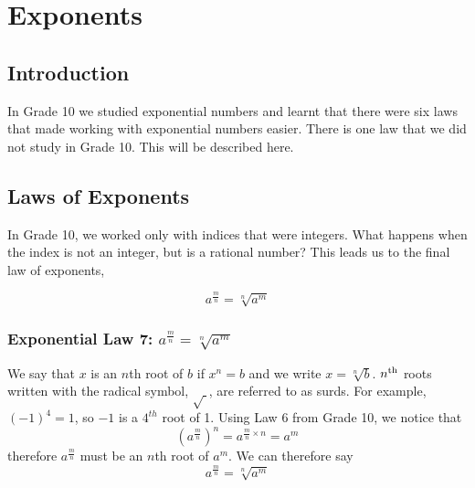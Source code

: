 \chapter{Exponents}
\label{m:ng11}  

\section{Introduction}
In Grade 10 we studied exponential numbers and learnt that there were six laws that made working with exponential numbers easier. There is one law that we did not study in Grade 10. This will be described here.

\section{Laws of Exponents}

In Grade 10, we worked only with indices that were integers. What happens when the index is not an integer, but is a rational number? This leads us to the final law of exponents,

\begin{equation}
\label{eq:mn:e:law7}
a^{\frac{m}{n}}= \sqrt[n]{a^m}
\end{equation}

\subsection{Exponential Law 7: $a^{\frac mn}=\sqrt[n]{a^m}$}
We say that $x$ is an $n$th root of $b$ if $x^n=b$ and we write $x=\sqrt[n]{b}$. $n^{\rm th}$ roots written with the radical symbol, $\sqrt{~}$, are referred to as surds. For example, $(-1)^4=1$, so $-1$ is a $4^{th}$ root of 1. Using Law 6 from Grade 10, we notice that
\begin{equation}
\label{eq:mn:e:law7:col} 
(a^{\frac mn})^n=a^{\frac mn\times{n}}=a^m
\end{equation}
therefore $a^{\frac mn}$ must be an $n$th root of $a^m$. We can therefore say
\begin{equation}
\label{eq:mn:e:law7:proof}
a^{\frac mn}=\sqrt[n]{a^m}
\end{equation}

